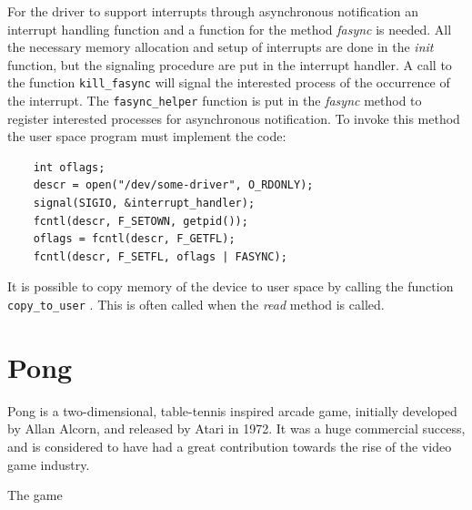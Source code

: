 For the driver to support interrupts through asynchronous notification an interrupt handling function and a function for the method \emph{fasync} is needed. All the necessary memory allocation and setup of interrupts are done in the \emph{init} function, but the signaling procedure are put in the interrupt handler. A call to the function \texttt{kill\_fasync} \cite{fasync} will signal the interested process of the occurrence of the interrupt. The \texttt{fasync\_helper} \cite{fasync} function is put in the \emph{fasync} method to register interested processes for asynchronous notification. To invoke this method the user space program must implement the code:

\begin{lstlisting}
    int oflags;
    descr = open("/dev/some-driver", O_RDONLY);
    signal(SIGIO, &interrupt_handler);
    fcntl(descr, F_SETOWN, getpid());
    oflags = fcntl(descr, F_GETFL);
    fcntl(descr, F_SETFL, oflags | FASYNC);
\end{lstlisting}

It is possible to copy memory of the device to user space by calling the function \texttt{copy\_to\_user} \cite{cpyusr}. This is often called when the \emph{read} method is called. 




\section{Pong}

Pong is a two-dimensional, table-tennis inspired arcade game, initially developed by Allan Alcorn, and released by Atari in 1972. It was a huge commercial success, and is considered to have had a great contribution towards the rise of the video game industry. 

The game 